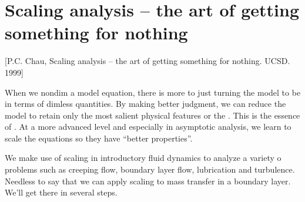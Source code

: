 \section{Scaling analysis -- the art of getting something for nothing}
%
\newcommand{\posx}{x^*} %
\newcommand{\posy}{y^*} %
\newcommand{\velx}{u^*} %
\newcommand{\vely}{v^*} %
%
\newcommand{\posz}{z^*}   %
\newcommand{\posr}{r^*}   %
\newcommand{\vela}{u^*_z} %
%
\newcommand{\refq}{_\text{ref}} %
%
\newcommand{\ndconc}{c}      %
\newcommand{\ndposx}{x}      %
\newcommand{\ndposy}{y}      %
\newcommand{\ndposz}{z}      %
\newcommand{\ndposr}{r}      %
\newcommand{\ndvelx}{u}      %
\newcommand{\ndvely}{v}      %
\newcommand{\ndtemp}{\theta} %
\newcommand{\mfpath}{\lambda}%
%
\newcommand{\fsconc}{c_{\infty}} %
\newcommand{\fsvel}{u_{\infty}}  %
\newcommand{\rradius}{\rho}      %
\newcommand{\kforcoeff}{\kappa}  %
%
\newcommand{\blthck}{\delta}          %
\newcommand{\cblthck}{\delta\txt{c}}  %
\newcommand{\tblthck}{\delta\txt{t}} %
%
\newcommand{\lilo}[1]{o\vat{#1}} %


[P.C. Chau, Scaling analysis -- the art of getting something for nothing. UCSD. 1999]

When we nondim a model equation, there is more to just turning the model to be in terms of dimless quantities. By making better judgment, we can reduce the model to retain only the most salient physical features or the . This is the essence of . At a more advanced level and especially in asymptotic analysis, we learn to scale the equations so they have ``better properties''.

We make use of scaling in introductory fluid dynamics to analyze a variety o problems such as creeping flow, boundary layer flow, lubrication and turbulence. Needless to say that we can apply scaling to mass transfer in a boundary layer. We'll get there in several steps.


